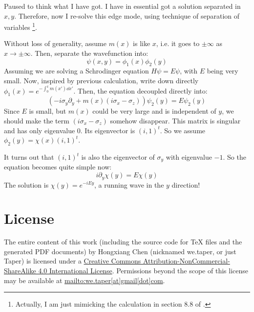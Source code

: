 \documentclass{article}
\begin{document}
    Paused to think what I have got. I have in essential got a
    solution separated in $x,y$. Therefore, now I re-solve this edge
    mode, using technique of separation of variables 
    \footnote{Actually, I am just mimicking the calculation
    in section 8.8 of \cite{Bernevig2013}.}. 

    Without loss of generality, assume $m(x)$ is like $x$, i.e. it
    goes to $\pm\infty$ as $x\to\pm\infty$. Then, separate the
    wavefunction into:
    \begin{equation}
        \psi(x,y) = \phi_1(x)\phi_2(y)
    \end{equation}
    Assuming we are solving a Schrodinger equation $H\psi=E\psi$, with
    $E$ being very small.  Now, inspired by previous calculation,
    write down directly $\phi_1(x)=e^{-\int_0^x m(x')\dd{x'}}$.  Then,
    the equation decoupled directly into:
    \begin{equation}
        \left(
            -i\sigma_y\partial_y + m(x)\left(i\sigma_x-\sigma_z\right)
        \right)\psi_2(y) = E\psi_2(y)
    \end{equation}
    Since $E$ is small, but $m(x)$ could be very large and is
    independent of $y$, we should make the term $(i\sigma_x-\sigma_z)$
    somehow disappear. This matrix is singular and has only eigenvalue
    $0$. Its eigenvector is $(i,1)^t$. So we assume
    $\phi_2(y)=\chi(x)(i,1)^t$.
    
    It turns out that $(i,1)^t$ is also the eigenvector of
    $\sigma_y$ with eigenvalue $-1$. So the equation becomes quite
    simple now:
    \begin{equation}
        i\partial_y\chi(y) = E\chi(y)
    \end{equation}
    The solution is $\chi(y)=e^{-iEy}$, a running wave in the $y$
    direction!
\section{License}
The entire content of this work (including the source code
for TeX files and the generated PDF documents) by 
Hongxiang Chen (nicknamed we.taper, or just Taper) is
licensed under a 
\href{http://creativecommons.org/licenses/by-nc-sa/4.0/}{Creative 
Commons Attribution-NonCommercial-ShareAlike 4.0 International 
License}. Permissions beyond the scope of this 
license may be available at \url{mailto:we.taper[at]gmail[dot]com}.
{}


\printnomenclature
\end{document}

